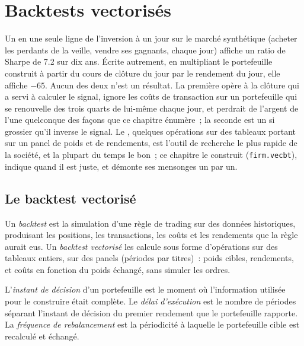 \chapter{Backtests vectorisés}\label{ch:rs:vectorised-backtests}

Un  en une seule ligne de l'inversion à un jour sur le marché synthétique (acheter les perdants de la veille, vendre ses gagnants, chaque jour) affiche un ratio de Sharpe
de 7.2 sur dix ans. Écrite autrement, en multipliant le portefeuille construit à partir du cours de clôture du jour par le rendement du jour, elle affiche
$-65$. Aucun des deux n'est un résultat. La première opère à la clôture qui a servi à calculer le signal, ignore les coûts de transaction sur un portefeuille qui
se renouvelle des trois quarts de lui-même chaque jour, et perdrait de l'argent de l'une quelconque des façons que ce chapitre énumère~; la seconde est un  si
grossier qu'il inverse le signal. Le , quelques opérations sur des tableaux portant sur un panel de poids et de rendements, est l'outil de recherche le plus rapide de la
société, et la plupart du temps le bon~; ce chapitre le construit (\texttt{firm.vecbt}), indique quand il est juste, et
démonte ses mensonges un par un.

\section{Le backtest vectorisé}

\begin{definition}\label{def:rs:vectorised-backtests:backtest}
Un \emph{backtest} est la simulation d'une règle de trading sur des données historiques, produisant les positions, les transactions, les coûts et
les rendements que la règle aurait eus. Un \emph{backtest vectorisé} les calcule sous forme d'opérations sur des tableaux entiers, sur des panels
(périodes par titres)~: poids cibles, rendements, et coûts en fonction du poids échangé, sans simuler les ordres.
\end{definition}

\begin{definition}\label{def:rs:vectorised-backtests:timing}
L'\emph{instant de décision} d'un portefeuille est le moment où l'information utilisée pour le construire était complète. Le
\emph{délai d'exécution} est le nombre de périodes séparant l'instant de décision du premier rendement que le portefeuille rapporte. La
\emph{fréquence de rebalancement} est la périodicité à laquelle le portefeuille cible est recalculé et échangé.
\end{definition}

